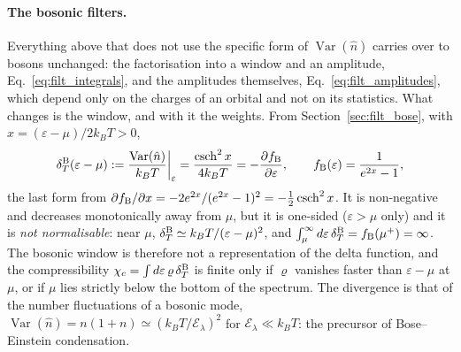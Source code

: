 \documentclass[10pt,a4paper]{article}
\theoremstyle{plain}
\theoremstyle{remark}
\newcommand{\Var}{\operatorname{Var}}
\newcommand{\enrg}{\mathcal{E}}  %
\begin{document}
\paragraph{The bosonic filters.} Everything above that does not use the specific
form of $ \Var(\hat n) $ carries over to bosons unchanged: the factorisation into
a window and an amplitude, Eq.~\eqref{eq:filt_integrals}, and the amplitudes
themselves, Eq.~\eqref{eq:filt_amplitudes}, which depend only on the charges of an
orbital and not on its statistics. What changes is the window, and with it the
weights. From Section~\ref{sec:filt_bose}, with $ x = (\varepsilon - \mu)/2k_BT > 0 $,
\[
  \delta^{\rm B}_T(\varepsilon - \mu) := \frac{\Var(\hat n)}{k_BT}\bigg|_{\varepsilon}
  = \frac{\operatorname{csch}^{2}x}{4k_BT}
  = -\frac{\partial f_{\rm B}}{\partial\varepsilon} ,
  \qquad f_{\rm B}(\varepsilon) = \frac{1}{e^{2x} - 1} ,
\]
the last form from $ \partial f_{\rm B}/\partial x = -2e^{2x}/(e^{2x} - 1)^{2} =
-\tfrac12\operatorname{csch}^{2}x $. It is non-negative and decreases monotonically
away from $ \mu $, but it is one-sided ($ \varepsilon > \mu $ only) and it is
\emph{not normalisable}: near $ \mu $, $ \delta^{\rm B}_T \simeq k_BT/(\varepsilon - \mu)^{2} $, and
$ \int_\mu^\infty d\varepsilon\,\delta^{\rm B}_T = f_{\rm B}(\mu^{+}) = \infty $. The bosonic
window is therefore not a representation of the delta function, and the
compressibility $ \chi_c = \int d\varepsilon\,\varrho\,\delta^{\rm B}_T $ is finite only if
$ \varrho $ vanishes faster than $ \varepsilon - \mu $ at $ \mu $, or if $ \mu $ lies strictly
below the bottom of the spectrum. The divergence is that of the number fluctuations
of a bosonic mode, $ \Var(\hat n) = n(1+n) \simeq (k_BT/\enrg_\lambda)^{2} $ for
$ \enrg_\lambda \ll k_BT $: the precursor of Bose--Einstein condensation.
\end{document}
